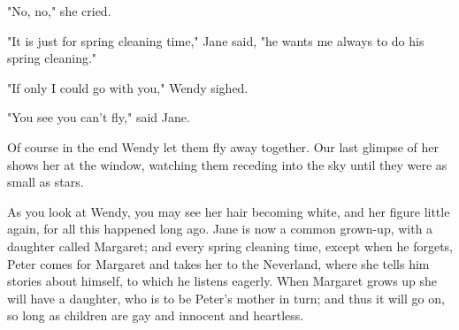"No, no," she cried.


"It is just for spring cleaning time," Jane said, "he wants me always to
do his spring cleaning."


"If only I could go with you," Wendy sighed.


"You see you can't fly," said Jane.


Of course in the end Wendy let them fly away together. Our last glimpse of
her shows her at the window, watching them receding into the sky until
they were as small as stars.


As you look at Wendy, you may see her hair becoming white, and her figure
little again, for all this happened long ago. Jane is now a common
grown-up, with a daughter called Margaret; and every spring cleaning time,
except when he forgets, Peter comes for Margaret and takes her to the
Neverland, where she tells him stories about himself, to which he listens
eagerly. When Margaret grows up she will have a daughter, who is to be
Peter's mother in turn; and thus it will go on, so long as children are
gay and innocent and heartless.

